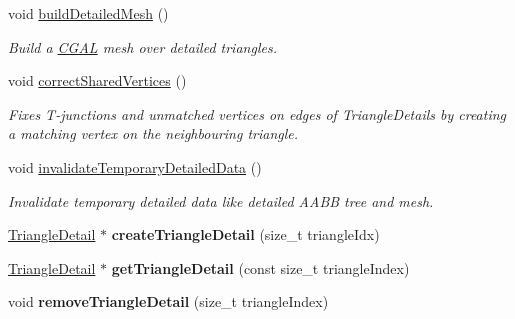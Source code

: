 \begin{DoxyCompactItemize}
void \mbox{\hyperlink{classpepr3d_1_1_geometry_a5f0594ebe7f3a779dc9cf18f943f1c56}{build\+Detailed\+Mesh}} ()
\begin{DoxyCompactList}\small\item\em Build a \mbox{\hyperlink{namespace_c_g_a_l}{C\+G\+AL}} mesh over detailed triangles. \end{DoxyCompactList}\item 
\mbox{\label{classpepr3d_1_1_geometry_aa981414573779195fbfb7a64cfcbc1f1}} 
void \mbox{\hyperlink{classpepr3d_1_1_geometry_aa981414573779195fbfb7a64cfcbc1f1}{correct\+Shared\+Vertices}} ()
\begin{DoxyCompactList}\small\item\em Fixes T-\/junctions and unmatched vertices on edges of Triangle\+Details by creating a matching vertex on the neighbouring triangle. \end{DoxyCompactList}\item 
\mbox{\label{classpepr3d_1_1_geometry_a69f341b26bd3ebd9158648b7d35ffa10}} 
void \mbox{\hyperlink{classpepr3d_1_1_geometry_a69f341b26bd3ebd9158648b7d35ffa10}{invalidate\+Temporary\+Detailed\+Data}} ()
\begin{DoxyCompactList}\small\item\em Invalidate temporary detailed data like detailed A\+A\+BB tree and mesh. \end{DoxyCompactList}\item 
\mbox{\label{classpepr3d_1_1_geometry_a3f3506ff18e87cd35469c89a7d7a71f3}} 
\mbox{\hyperlink{classpepr3d_1_1_triangle_detail}{Triangle\+Detail}} $\ast$ {\bfseries create\+Triangle\+Detail} (size\+\_\+t triangle\+Idx)
\item 
\mbox{\label{classpepr3d_1_1_geometry_a6b287e4fe195a2b1d74690ca4c387b95}} 
\mbox{\hyperlink{classpepr3d_1_1_triangle_detail}{Triangle\+Detail}} $\ast$ {\bfseries get\+Triangle\+Detail} (const size\+\_\+t triangle\+Index)
\item 
\mbox{\label{classpepr3d_1_1_geometry_a8c14c117f916e93e9578087dd85fe3ef}} 
void {\bfseries remove\+Triangle\+Detail} (size\+\_\+t triangle\+Index)
\item 
\mbox{\label{classpepr3d_1_1_geometry_aeabf9a91453ddd3d744ccbc862583874}} 

\end{DoxyCompactItemize}
